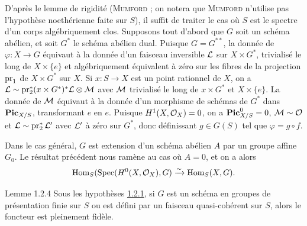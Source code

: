 \documentclass[10pt]{../fichiers-configuration-latex/smfart}
\begin{document}
D'après le lemme de rigidité (\textsc{Mumford} \cite[6.1. p.~115]{SGA4-18:4} ;
on notera que
\textsc{Mumford} n'utilise pas l'hypothèse noethérienne faite sur $S$), il
suffit de traiter le cas où $S$ est le spectre d'un corps
algébriquement clos. Supposons tout d'abord que $G$ soit un schéma
abélien, et soit $G^{\ast}$ le schéma abélien dual. Puisque
$G=G^{{\ast}{\ast}}$, la donnée de $\varphi:X\rightarrow G$ équivaut à
la donnée d'un faisceau inversible ${\mathcal L}$ sur $X\times
G^{\ast}$, trivialisé le long de $X\times \{e\}$ et algébriquement
équivalent à zéro sur les fibres de la projection
$\operatorname{pr}_{1}$ de $X\times G^{\ast}$ sur $X$. Si $x:S\to X$ est un point
rationnel de $X$, on a
${\mathcal L}\sim  \operatorname{pr}^{\ast}_{2}(x\times G^\ast)^{\ast}{\mathcal L}\otimes {\mathcal M}$ avec
${\mathcal M}$ trivialisé le long de $x\times G^{\ast}$ et $X\times
\{e\}$. La donnée de ${\mathcal M}$ équivaut à la donnée d'un morphisme
de schémas de $G^{\ast}$ dans $\operatorname{\mathbf{Pic}}_{X/S}$, transformant $e$ en
$e$. Puisque $H^{1}(X,{\mathcal O}_{X})=0$, on a $\operatorname{\mathbf{Pic}}^0_{X/S}=0$,
${\mathcal M}\sim{\mathcal O}$ et ${\mathcal L}\sim
\operatorname{pr}^{\ast}_{2}{\mathcal L}'$ avec ${\mathcal L}'$ 
à zéro sur
$G^{\ast}$, donc définissant $g\in G(S)$ tel que $\varphi=g\circ f$.

Dans le cas général, $G$ est extension d'un schéma abélien $A$ par un
groupe affine $G_0$. Le résultat précédent nous ramène au cas où
$A=0$, et on a alors
$$
\operatorname{Hom}_{S}(\operatorname{Spec} (H^0(X,{\mathcal O}_{X}),G)\xrightarrow{\sim}
\operatorname{Hom}_{S}(X,G){}.
$$

\begin{enonce*}{Lemme 1.2.4}
Sous les hypothèses \hyperref[XVIII.subsubsec1.2.1]{1.2.1}, si $G$ est un schéma
en groupes de présentation finie sur $S$ ou est défini par un faisceau
quasi-cohérent sur $S$, alors le foncteur  est
pleinement fidèle. 
\end{enonce*}
\end{document}
